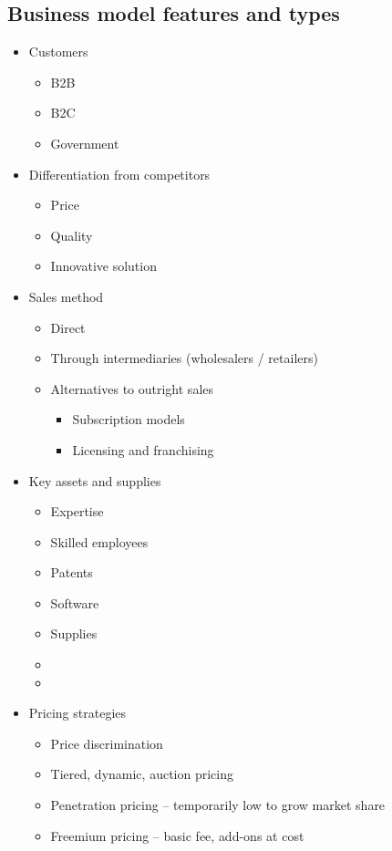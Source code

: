 \documentclass[../notes_compiled.tex]{subfiles}
\begin{document}
\subsection{Business model features and types}
\begin{multicols}{2}
\begin{itemize}
\item Customers
\begin{itemize}
\item B2B 
\item B2C 
\item Government
\end{itemize}
\item Differentiation from competitors
\begin{itemize}
\item Price
\item Quality
\item Innovative solution
\end{itemize}
\item Sales method
\begin{itemize}
\item Direct
\item Through intermediaries (wholesalers / retailers)
\item Alternatives to outright sales
\begin{itemize}
\item Subscription models
\item Licensing and franchising
\end{itemize}
\end{itemize}
\item Key assets and supplies
\begin{itemize}
\item Expertise
\item Skilled employees
\item Patents
\item Software
\item Supplies
\item[]
\item[]
\end{itemize}
\item Pricing strategies
\begin{itemize}
\item Price discrimination
\item Tiered, dynamic, auction pricing
\item Penetration pricing -- temporarily low to grow market share
\item Freemium pricing -- basic fee, add-ons at cost

\end{itemize}
\end{itemize}
\end{multicols}
\end{document}
